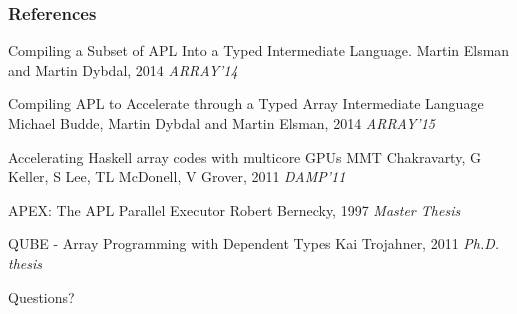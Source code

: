 \documentclass{beamer}
\begin{document}
\begin{frame}
\frametitle{References}
\footnotesize{
\begin{thebibliography}{99} %
 Compiling a Subset of APL Into a Typed Intermediate Language.
\newblock Martin Elsman and Martin Dybdal, 2014
\newblock \emph{ARRAY'14}

 Compiling APL to Accelerate through a Typed Array Intermediate Language
\newblock Michael Budde, Martin Dybdal and Martin Elsman, 2014
\newblock \emph{ARRAY'15}

 Accelerating Haskell array codes with multicore GPUs
\newblock MMT Chakravarty, G Keller, S Lee, TL McDonell, V Grover, 2011
\newblock \emph{DAMP'11}

 APEX: The APL Parallel Executor
\newblock Robert Bernecky, 1997
\newblock \emph{Master Thesis}

 QUBE - Array Programming with Dependent Types
\newblock Kai Trojahner, 2011
\newblock \emph{Ph.D. thesis}

\end{thebibliography}
}
\end{frame}

\begin{frame}
\Huge{\centerline{Questions?}}
\end{frame}







\end{document}
